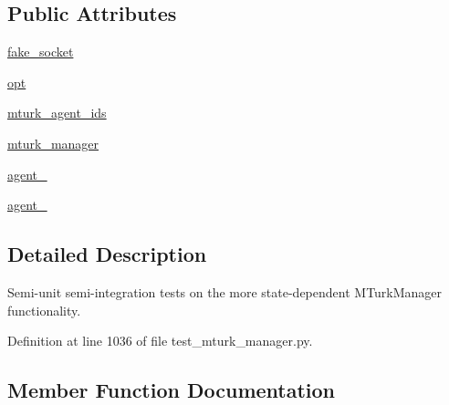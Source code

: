 \subsection*{Public Attributes}
\begin{DoxyCompactItemize}
\item 
\hyperlink{classparlai_1_1mturk_1_1core_1_1dev_1_1test_1_1test__mturk__manager_1_1TestMTurkManagerConnectedFunctions_aa488a2c74a44efa954d7f00d7d6f7364}{fake\+\_\+socket}
\item 
\hyperlink{classparlai_1_1mturk_1_1core_1_1dev_1_1test_1_1test__mturk__manager_1_1TestMTurkManagerConnectedFunctions_ae031b00d0578e66e16776d21f3b17cbb}{opt}
\item 
\hyperlink{classparlai_1_1mturk_1_1core_1_1dev_1_1test_1_1test__mturk__manager_1_1TestMTurkManagerConnectedFunctions_a9a1019796c71636d8fb2260ed140e53d}{mturk\+\_\+agent\+\_\+ids}
\item 
\hyperlink{classparlai_1_1mturk_1_1core_1_1dev_1_1test_1_1test__mturk__manager_1_1TestMTurkManagerConnectedFunctions_aebae0d07a4711e62c3d8453b36f04a93}{mturk\+\_\+manager}
\item 
\hyperlink{classparlai_1_1mturk_1_1core_1_1dev_1_1test_1_1test__mturk__manager_1_1TestMTurkManagerConnectedFunctions_a82517cee6c47de3f79d4dfdddbae1a5b}{agent\+\_}
\item 
\hyperlink{classparlai_1_1mturk_1_1core_1_1dev_1_1test_1_1test__mturk__manager_1_1TestMTurkManagerConnectedFunctions_afcd9b1d86894071982c38aeddc2b69c2}{agent\+\_}
\end{DoxyCompactItemize}


\subsection{Detailed Description}
\begin{DoxyVerb}Semi-unit semi-integration tests on the more state-dependent MTurkManager
functionality.
\end{DoxyVerb}
 

Definition at line 1036 of file test\+\_\+mturk\+\_\+manager.\+py.



\subsection{Member Function Documentation}
\mbox{\label{classparlai_1_1mturk_1_1core_1_1dev_1_1test_1_1test__mturk__manager_1_1TestMTurkManagerConnectedFunctions_a7fc003fa5fd1a550c5beb62e312a3493}} 
